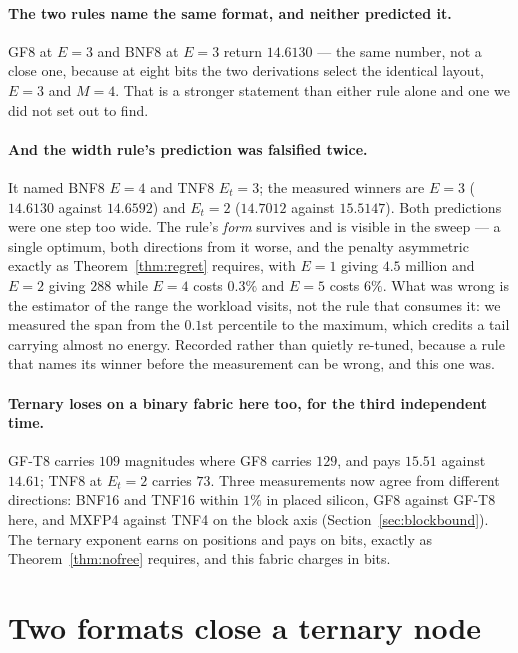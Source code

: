 \documentclass[11pt]{article}
\theoremstyle{definition}
\begin{document}
\paragraph{The two rules name the same format, and neither predicted it.}
GF8 at $E=3$ and BNF8 at $E=3$ return $14.6130$ --- the same number, not a close
one, because at eight bits the two derivations select the identical layout,
$E=3$ and $M=4$. That is a stronger statement than either rule alone and one we
did not set out to find.

\paragraph{And the width rule's prediction was falsified twice.} It named BNF8
$E=4$ and TNF8 $E_t=3$; the measured winners are $E=3$ ($14.6130$ against
$14.6592$) and $E_t=2$ ($14.7012$ against $15.5147$). Both predictions were one
step too wide. The rule's \emph{form} survives and is visible in the sweep ---
a single optimum, both directions from it worse, and the penalty asymmetric
exactly as Theorem~\ref{thm:regret} requires, with $E=1$ giving $4.5$ million
and $E=2$ giving $288$ while $E=4$ costs $0.3\%$ and $E=5$ costs $6\%$. What was
wrong is the estimator of the range the workload visits, not the rule that
consumes it: we measured the span from the $0.1$st percentile to the maximum,
which credits a tail carrying almost no energy. Recorded rather than quietly
re-tuned, because a rule that names its winner before the measurement can be
wrong, and this one was.

\paragraph{Ternary loses on a binary fabric here too, for the third independent
time.} GF-T8 carries $109$ magnitudes where GF8 carries $129$, and pays $15.51$
against $14.61$; TNF8 at $E_t=2$ carries $73$. Three measurements now agree from
different directions: BNF16 and TNF16 within $1\%$ in placed silicon, GF8
against GF-T8 here, and MXFP4 against TNF4 on the block axis
(Section~\ref{sec:blockbound}). The ternary exponent earns on positions and pays
on bits, exactly as Theorem~\ref{thm:nofree} requires, and this fabric charges
in bits.

\section{Two formats close a ternary node}
\label{sec:pair}
\end{document}
